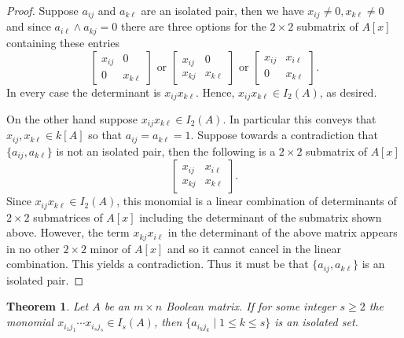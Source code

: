 \documentclass[10pt,a4paper]{amsart}
\theoremstyle{plain}
\newtheorem{theorem}{Theorem}
\theoremstyle{definition}
\begin{document}
\begin{proof}
Suppose $a_{ij}$ and $a_{k\ell}$ are an isolated pair, %
 then we have $x_{ij}\neq 0, x_{k\ell}\neq 0$ and since $a_{i\ell}\wedge a_{kj}=0$ there are three options for the $2\times 2$ submatrix of $A[x]$ containing these entries
\[
\begin{bmatrix}
    x_{ij}& 0\\
    0 & x_{k\ell}
\end{bmatrix} \text{ or } 
\begin{bmatrix}
    x_{ij}& 0\\
    x_{kj} & x_{k\ell}
\end{bmatrix} \text{ or }
\begin{bmatrix}
    x_{ij}& x_{i\ell}\\
    0 & x_{k\ell}
\end{bmatrix}.
\]
In every case the determinant is $x_{ij}x_{k\ell}$. Hence, $x_{ij}x_{k\ell}\in I_2(A)$, as desired. 

On the other hand suppose $x_{ij}x_{k\ell}\in I_2(A)$. In particular this conveys that $x_{ij},x_{k\ell}\in k[A]$ so that $a_{ij}=a_{k\ell}=1$. 
Suppose towards a  contradiction that $\{a_{ij},a_{k\ell}\}$ is not an isolated pair, 
then the following is  a $2\times 2$ submatrix of $A[x]$\[
\begin{bmatrix}
    x_{ij} & x_{i\ell}\\
    x_{kj}& x_{k\ell}
\end{bmatrix}.
\]
Since $x_{ij}x_{k\ell}\in I_2(A)$, this monomial is a linear combination of determinants of $2\times 2$ submatrices of $A[x]$ including the determinant of the submatrix shown above.
However, the term $x_{kj}x_{i\ell}$ in the determinant of the above matrix appears in no other $2\times 2$ minor of $A[x]$ and so it cannot cancel in the linear combination. This yields a contradiction. Thus it must be that $\{a_{ij},a_{k\ell}\}$ is an isolated pair.
\end{proof}

\begin{theorem}\label{thm: monomials=isolated}
        Let $A$ be an $m\times n$ Boolean matrix. If for some integer $s\geq 2$ the monomial $x_{i_1 j_1}\cdots x_{i_sj_s}\in I_s(A)$, then  $\{a_{i_k j_k}\mid 1\leq k\leq s\}$ is an isolated set.
\end{theorem}
\end{document}
